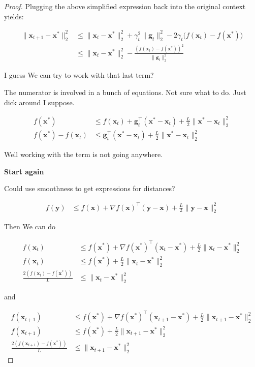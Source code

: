 \documentclass{article}
\begin{document}
\begin{proof}
	Plugging the above simplified expression back into the original context yields:
	
	\begin{align}
		\|\mathbf{x}_{t+1} - \mathbf{x}^*\|^2_2 &\le \|\mathbf{x}_t  - \mathbf{x}^* \|^2_2 + \gamma_t^2\|\mathbf{g}_t\|^2_2 - 2\gamma_t\big( f(\mathbf{x}_t) - f(\mathbf{x}^*) \big)\\
		&\le \|\mathbf{x}_t  - \mathbf{x}^* \|^2_2 - \frac{(f(\mathbf{x}_t)-f(\mathbf{x}^*))^2}{\|\mathbf{g}_t\|^2_2}  
	\end{align}
	
	I guess We can try to work with that last term?
	
	The numerator is involved in a bunch of equations. Not sure what to do. Just dick around I suppose.
	
	\begin{align}
		f(\mathbf{x}^*) &\le f(\mathbf{x}_t) + \mathbf{g}_t^\top(\mathbf{x}^*-\mathbf{x}_{t}) + \frac{L}{2}\|\mathbf{x}^*-\mathbf{x}_{t}\|^2_2\\
		f(\mathbf{x}^*) -  f(\mathbf{x}_t) & \le  \mathbf{g}_t^\top(\mathbf{x}^*-\mathbf{x}_{t}) + \frac{L}{2}\|\mathbf{x}^*-\mathbf{x}_{t}\|^2_2
	\end{align}
	
	Well working with the term is not going anywhere. 
	
	\textbf{Start again}
	
	Could use smoothness to get expressions for distances?
	
	\begin{align}
		f(\mathbf{y}) &\le f(\mathbf{x}) + \nabla f(\mathbf{x})^\top(\mathbf{y}-\mathbf{x}) + \frac{L}{2}\|\mathbf{y}-\mathbf{x}\|^2_2
	\end{align}
	
	Then We can do
	
	\begin{align}
		f(\mathbf{x}_t) &\le f(\mathbf{x}^*) + \nabla f(\mathbf{x}^*)^\top(\mathbf{x}_t-\mathbf{x}^*) + \frac{L}{2}\|\mathbf{x}_t-\mathbf{x}^*\|^2_2\\
		f(\mathbf{x}_t) &\le f(\mathbf{x}^*)  + \frac{L}{2}\|\mathbf{x}_t-\mathbf{x}^*\|^2_2\\
		\frac{2(f(\mathbf{x}_t) -  f(\mathbf{x}^*))}{L} &\le \|\mathbf{x}_t-\mathbf{x}^*\|^2_2
	\end{align}
	
	and
	
	\begin{align}
		f(\mathbf{x}_{t+1}) &\le f(\mathbf{x}^*) + \nabla f(\mathbf{x}^*)^\top(\mathbf{x}_{t+1}-\mathbf{x}^*) + \frac{L}{2}\|\mathbf{x}_{t+1}-\mathbf{x}^*\|^2_2\\
		f(\mathbf{x}_{t+1}) &\le f(\mathbf{x}^*) + \frac{L}{2}\|\mathbf{x}_{t+1}-\mathbf{x}^*\|^2_2\\
		\frac{2(f(\mathbf{x}_{t+1}) - f(\mathbf{x}^*))}{L} &\le  \|\mathbf{x}_{t+1}-\mathbf{x}^*\|^2_2
	\end{align}
	

\end{proof}
\end{document}
